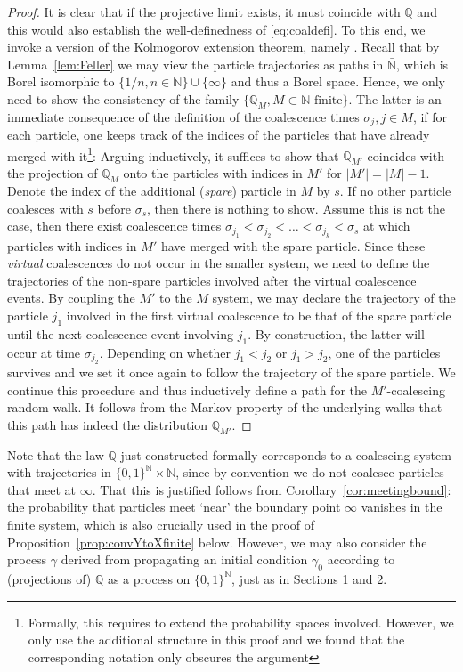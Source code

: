 \documentclass[11pt,a4paper]{scrartcl}
\numberwithin{equation}{section}
\theoremstyle{plain}
\theoremstyle{definition}
\theoremstyle{remark}
\newcommand{\bN}{\ensuremath{\mathbb{N}}}
\begin{document}
\begin{proof}
It is clear that if the projective limit exists, it must coincide with $\mathbb{Q}$ and this would also establish the well-definedness of \eqref{eq:coaldefi}. To this end, we invoke a version of the Kolmogorov extension theorem, namely \cite[Theorem 8.23]{KallenbergFM}. Recall that by Lemma~\ref{lem:Feller} we may view the particle trajectories as paths in $\bar{\bN}$, which is Borel isomorphic to $\{1/n, n\in\bN\}\cup\{\infty\}$ and thus a Borel space. Hence, we only need to show the consistency of the family $\{\mathbb{Q}_M, M\subset\bN \text{ finite}\}$. The latter is an immediate consequence of the definition of the coalescence times $\sigma_j, j\in M$, if for each particle, one keeps track of the indices of the particles that have already merged with it\footnote{ Formally, this requires to extend the probability spaces involved. However, we only use the additional structure in this proof and we found that the corresponding notation only obscures the argument}: Arguing inductively, it suffices to show that $\mathbb{Q}_{M'}$ coincides with the projection of $\mathbb{Q}_M$ onto the particles with indices in $M'$ for $|M'|=|M|-1$. Denote the index of the additional (\emph{spare}) particle in $M$ by $s$. If no other particle coalesces with $s$ before $\sigma_s$, then there is nothing to show. Assume this is not the case, then there exist coalescence times $\sigma_{j_1}<\sigma_{j_{2}}<\dots<\sigma_{j_k}<\sigma_s$ at which particles with indices in $M'$ have merged with the spare particle. Since these \emph{virtual} coalescences do not occur in the smaller system, we need to define the trajectories of the non-spare particles involved after the virtual coalescence events. By coupling the $M'$ to the $M$ system, we may declare the trajectory of the particle $j_1$ involved in the first virtual coalescence to be that of the spare particle until the next coalescence event involving $j_1$. By construction, the latter will occur at time $\sigma_{j_{2}}$. Depending on whether $j_1<j_2$ or $j_1>j_2$, one of the particles survives and we set it once again to follow the trajectory of the spare particle. We continue this procedure and thus inductively define a path for the $M'$-coalescing random walk. It follows from the Markov property of the underlying walks that this path has indeed the distribution $\mathbb{Q}_{M'}$.
\end{proof}
Note that the law $\mathbb{Q}$ just constructed formally corresponds to a coalescing system with trajectories in $\{0,1\}^{\bN}\times \bN$, since by convention we do not coalesce particles that meet at $\infty$. That this is justified follows from Corollary~\ref{cor:meetingbound}: the probability that particles meet `near' the boundary point $\infty$ vanishes in the finite system, which is also crucially used in the proof of Proposition~\ref{prop:convYtoXfinite} below. However, we may also consider the process $\gamma$ derived from propagating an initial condition $\gamma_0$ according to (projections of) $\mathbb{Q}$ as a process on $\{0,1\}^{\bN}$, just as in Sections 1 and 2.
\end{document}
